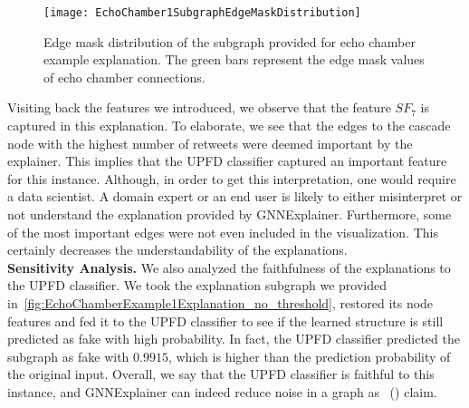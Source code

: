 \begin{figure}
    \centering
    \texttt{[image: EchoChamber1SubgraphEdgeMaskDistribution]}
    \caption[Edge mask distribution of the subgraph provided for echo chamber example explanation.]{Edge mask distribution of the subgraph provided for echo chamber example explanation. The green bars represent the edge mask values of echo chamber connections.}
    \label{fig:EchoChamber1SubgraphEdgeMaskDistribution}
\end{figure}
Visiting back the features we introduced, we observe that the feature $SF_7$ is captured in this explanation. To elaborate, we see that the edges to the cascade node with the highest number of retweets were deemed important by the explainer. This implies that the UPFD classifier captured an important feature for this instance. Although, in order to get this interpretation, one would require a data scientist. A domain expert or an end user is likely to either misinterpret or not understand the explanation provided by GNNExplainer. Furthermore, some of the most important edges were not even included in the visualization. This certainly decreases the understandability of the explanations.\\
\textbf{Sensitivity Analysis.} We also analyzed the faithfulness of the explanations to the UPFD classifier. We took the explanation subgraph we provided in~\ref{fig:EchoChamberExample1Explanation_no_threshold}, restored its node features and fed it to the UPFD classifier to see if the learned structure is still predicted as fake with high probability. In fact, the UPFD classifier predicted the subgraph as fake with $0.9915$, which is higher than the prediction probability of the original input. Overall, we say that the UPFD classifier is faithful to this instance, and GNNExplainer can indeed reduce noise in a graph as~\citeauthor{GNNExplainer_Ying} (\citeyear{GNNExplainer_Ying}) claim.\\
